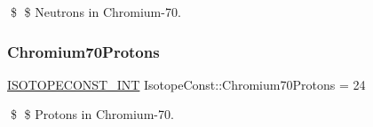 \$ \$ Neutrons in Chromium-\/70. \mbox{\label{group___isotope_const-_chromium-_cr70_gadc8088221a9552f5a868a22ef8b44374}} 
\subsubsection{\texorpdfstring{Chromium70\+Protons}{Chromium70Protons}}
{\footnotesize\ttfamily \mbox{\hyperlink{group___isotope_const-_macros_ga5f18360b3e99483a35c32d789e62621c}{I\+S\+O\+T\+O\+P\+E\+C\+O\+N\+S\+T\+\_\+\+I\+NT}} Isotope\+Const\+::\+Chromium70\+Protons = 24}

\$ \$ Protons in Chromium-\/70. 